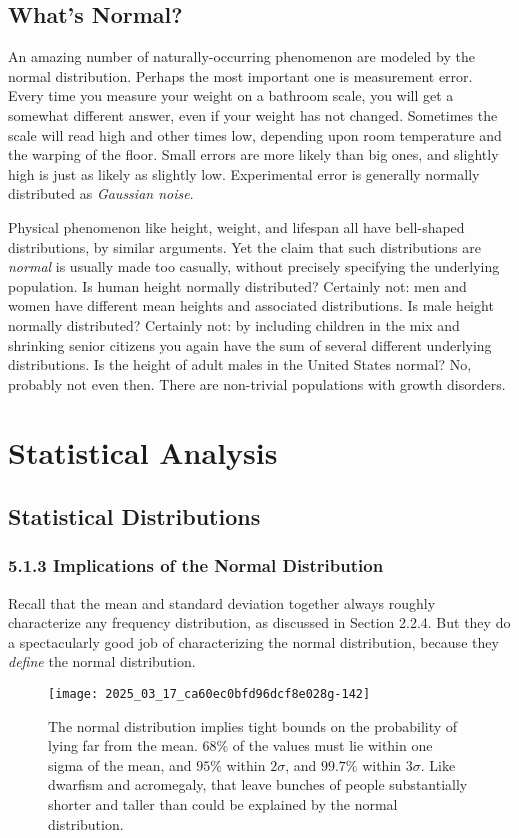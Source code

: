 \documentclass[10pt]{article}
\begin{document}
\section*{What's Normal?}
An amazing number of naturally-occurring phenomenon are modeled by the normal distribution. Perhaps the most important one is measurement error. Every time you measure your weight on a bathroom scale, you will get a somewhat different answer, even if your weight has not changed. Sometimes the scale will read high and other times low, depending upon room temperature and the warping of the floor. Small errors are more likely than big ones, and slightly high is just as likely as slightly low. Experimental error is generally normally distributed as \textit{Gaussian noise}.

Physical phenomenon like height, weight, and lifespan all have bell-shaped distributions, by similar arguments. Yet the claim that such distributions are \textit{normal} is usually made too casually, without precisely specifying the underlying population. Is human height normally distributed? Certainly not: men and women have different mean heights and associated distributions. Is male height normally distributed? Certainly not: by including children in the mix and shrinking senior citizens you again have the sum of several different underlying distributions. Is the height of adult males in the United States normal? No, probably not even then. There are non-trivial populations with growth disorders.
\chapter{Statistical Analysis}

\section{Statistical Distributions}
\subsection*{5.1.3 Implications of the Normal Distribution}
Recall that the mean and standard deviation together always roughly characterize any frequency distribution, as discussed in Section 2.2.4. But they do a spectacularly good job of characterizing the normal distribution, because they \textit{define} the normal distribution.

\begin{figure}[H]
\centering
\texttt{[image: 2025\_03\_17\_ca60ec0bfd96dcf8e028g-142]}
\caption{The normal distribution implies tight bounds on the probability of lying far from the mean. $68 \%$ of the values must lie within one sigma of the mean, and $95 \%$ within $2 \sigma$, and $99.7 \%$ within $3 \sigma$. Like dwarfism and acromegaly, that leave bunches of people substantially shorter and taller than could be explained by the normal distribution.}
\end{figure}
\end{document}
